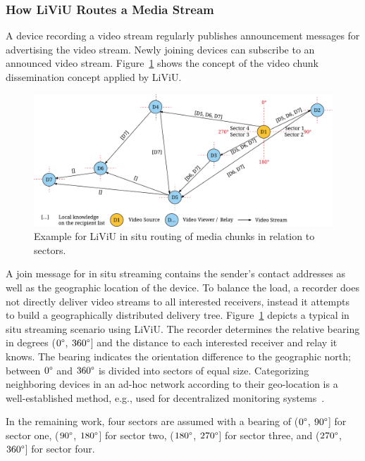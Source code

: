 \subsubsection{How LiViU Routes a Media Stream}
A device recording a video stream regularly publishes announcement messages for advertising the video stream.
Newly joining devices can subscribe to an announced video stream.
Figure~\ref{fig:524_routing1} shows the concept of the video chunk dissemination concept applied by \ac{LiViU}.
\begin{figure}
	\centering
	\includegraphics[width=\linewidth]{gfx/500_MobileUpload/MBS_Insitu_Routing_1}
	\caption[Example for LiViU in situ routing of media chunks]{Example for LiViU in situ routing of media chunks in relation to sectors.}
	\label{fig:524_routing1}
\end{figure}

A join message for in situ streaming contains the sender's contact addresses as well as the geographic location of the device. 
To balance the load, a recorder does not directly deliver video streams to all interested receivers, instead it attempts to build a geographically distributed delivery tree. 
Figure~\ref{fig:524_routing1} depicts a typical in situ streaming scenario using \ac{LiViU}.
The recorder determines the relative bearing in degrees ($0\degree$, $360\degree$] and the distance to each interested receiver and relay it knows. 
The bearing indicates the orientation difference to the geographic north; between $0\degree$ and $360\degree$ is divided into sectors of equal size.
Categorizing neighboring devices in an ad-hoc network according to their geo-location is a well-established method, e.g., used for decentralized monitoring systems~\cite{Gross2012}.

In the remaining work, four sectors are assumed with a bearing of ($0\degree$, $90\degree$] for sector one, ($90\degree$, $180\degree$] for sector two, ($180\degree$, $270\degree$] for sector three, and ($270\degree$, $360\degree$] for sector four. 

